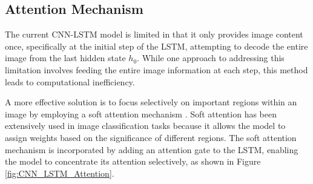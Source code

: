\documentclass[conference]{IEEEtran}
\begin{document}









\subsection{Attention Mechanism\label{attention}}




The current CNN-LSTM model is limited in that it only provides image content once, specifically at the initial step of the LSTM, attempting to decode the entire image from the last hidden state $h_0$. While one approach to addressing this limitation involves feeding the entire image information %
at each step, this method leads to computational inefficiency.


A more effective solution is to focus selectively on important regions within an image by employing a soft attention mechanism \cite{mcclenny2020self}. Soft attention has been extensively used in image classification tasks \cite{wang2017residual} %
because it allows the model to assign weights based on the significance of different regions. The soft attention mechanism is incorporated by adding an attention gate to the LSTM, enabling the model to concentrate its attention selectively, as shown in Figure \ref{fig:CNN_LSTM_Attention}.
\end{document}
